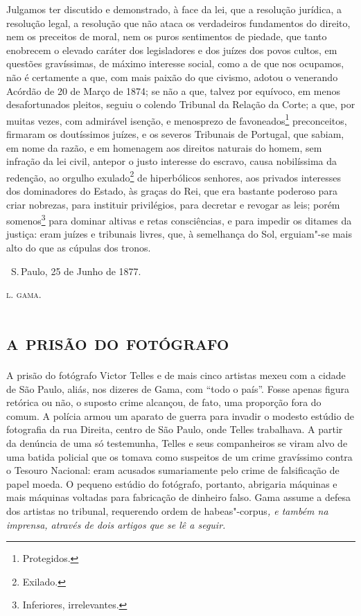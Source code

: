 Julgamos ter discutido e demonstrado, à face da lei, que a resolução
jurídica, a resolução legal, a resolução que não ataca os verdadeiros
fundamentos do direito, nem os preceitos de moral, nem os puros
sentimentos de piedade, que tanto enobrecem o elevado caráter dos
legisladores e dos juízes dos povos cultos, em questões gravíssimas, de
máximo interesse social, como a de que nos ocupamos, não é certamente a
que, com mais paixão do que civismo, adotou o venerando Acórdão de 20 de
Março de 1874; se não a que, talvez por equívoco, em menos
desafortunados pleitos, seguiu o colendo Tribunal da Relação da Corte; a
que, por muitas vezes, com admirável isenção, e menosprezo de
favoneados\footnote{Protegidos.} preconceitos, firmaram os doutíssimos
juízes, e os severos Tribunais de Portugal, que sabiam, em nome da
razão, e em homenagem aos direitos naturais do homem, sem infração da
lei civil, antepor o justo interesse do escravo, causa nobilíssima da
redenção, ao orgulho exulado\footnote{Exilado.} de hiperbólicos
senhores, aos privados interesses dos dominadores do Estado, às graças
do Rei, que era bastante poderoso para criar nobrezas, para instituir
privilégios, para decretar e revogar as leis; porém somenos\footnote{
  Inferiores, irrelevantes.}
para dominar altivas e
retas consciências, e para impedir os ditames da justiça: eram juízes e
tribunais livres, que, à semelhança do Sol, erguiam"-se mais alto do que
as cúpulas dos tronos.

\bigskip

\hfill\ S.\,Paulo, 25 de Junho de 1877.\smallskip

\hfill\textsc{l. gama.}

\pagebreak
\thispagestyle{empty}
\movetooddpage
\thispagestyle{empty}


\begingroup\makeatletter\@openrightfalse
\part{\textsc{a prisão do fotógrafo}}

\mbox{}\vfill
\thispagestyle{empty}
{\small\noindent
A prisão do fotógrafo Victor Telles e de mais cinco artistas mexeu
com a cidade de São Paulo, aliás, nos dizeres de Gama, com ``todo o
país''. Fosse apenas figura retórica ou não, o suposto crime alcançou, de
fato, uma proporção fora do comum. A polícia armou um aparato de guerra
para invadir o modesto estúdio de fotografia da rua Direita, centro de
São Paulo, onde Telles trabalhava. A partir da denúncia de uma só
testemunha, Telles e seus companheiros se viram alvo de uma batida
policial que os tomava como suspeitos de um crime gravíssimo contra o
Tesouro Nacional: eram acusados sumariamente pelo crime de falsificação
de papel moeda. O pequeno estúdio do fotógrafo, portanto, abrigaria
máquinas e mais máquinas voltadas para fabricação de dinheiro falso.
Gama assume a defesa dos artistas no tribunal, requerendo ordem de}
habeas"-corpus\emph{, e também na imprensa, através de dois artigos que
se lê a seguir. }
\@openrighttrue\makeatother \endgroup


